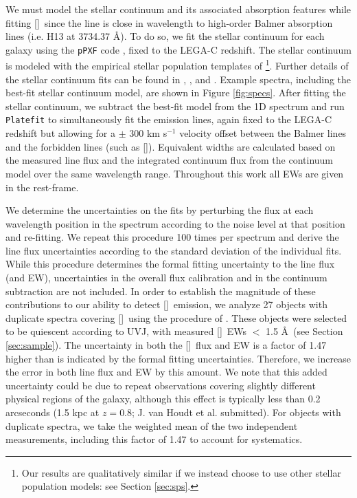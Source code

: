 \documentclass[twocolumn,natbib,iop,hyperref]{aastex62}
\newcommand{\pf}{\texttt{Platefit} }
\newcommand{\oii}{[\ion{O}{2}]}
\begin{document}
We must model the stellar continuum and its associated absorption features while fitting \oii\ since the line is close in wavelength to high-order Balmer absorption lines (i.e. H13 at 3734.37 \AA).  To do so, we fit the stellar continuum for each galaxy using the \texttt{pPXF} code \citep{2004PASP..116..138C,2012ascl.soft10002C,2017MNRAS.466..798C}, fixed to the LEGA-C redshift.  The stellar continuum is modeled with the empirical stellar population templates of \citet{2010MNRAS.404.1639V}\footnote{Our results are qualitatively similar if we instead choose to use other stellar population models: see Section \ref{sec:sps}.}.  Further details of the stellar continuum fits can be found in \citet{2016ApJS..223...29V}, \citet{2018ApJ...868L..36B}, and \citet{2018ApJS..239...27S}.  Example spectra, including the best-fit stellar continuum model, are shown in Figure \ref{fig:specs}.  After fitting the stellar continuum, we subtract the best-fit model from the 1D spectrum and run \pf \citep{2004ApJ...613..898T, 2004MNRAS.351.1151B,2020MNRAS.tmp.2359G} to simultaneously fit the emission lines, again fixed to the LEGA-C redshift but allowing for a $\pm$ 300 km s$^{-1}$ velocity offset between the Balmer lines and the forbidden lines (such as \oii).  Equivalent widths are calculated based on the measured line flux and the integrated continuum flux from the continuum model over the same wavelength range.  Throughout this work all EWs are given in the rest-frame.



We determine the uncertainties on the fits by perturbing the flux at each wavelength position in the spectrum according to the noise level at that position and re-fitting.  We repeat this procedure 100 times per spectrum and derive the line flux uncertainties according to the standard deviation of the individual fits.  While this procedure determines the formal fitting uncertainty to the line flux (and EW), uncertainties in the overall flux calibration and in the continuum subtraction are not included.  In order to establish the magnitude of these contributions to our ability to detect \oii\ emission, we analyze 27 objects with duplicate spectra covering \oii\ using the procedure of \citet{2008AA...485..657B}.  These objects were selected to be quiescent according to UVJ, with measured \oii\ EWs $<$ 1.5 \AA\ (see Section \ref{sec:sample}).  The uncertainty in both the \oii\ flux and EW is a factor of 1.47 higher than is indicated by the formal fitting uncertainties.  Therefore, we increase the error in both line flux and EW by this amount.  We note that this added uncertainty could be due to repeat observations covering slightly different physical regions of the galaxy, although this effect is typically less than 0.2 arcseconds (1.5 kpc at $z=0.8$; J. van Houdt et al. submitted).  For objects with duplicate spectra, we take the weighted mean of the two independent measurements, including this factor of 1.47 to account for systematics.
\end{document}
